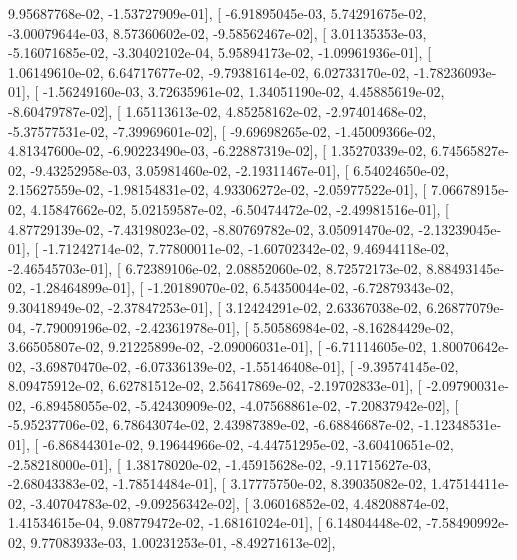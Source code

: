 \documentclass{article}
\begin{document}
          9.95687768e-02,  -1.53727909e-01],
       [ -6.91895045e-03,   5.74291675e-02,  -3.00079644e-03,
          8.57360602e-02,  -9.58562467e-02],
       [  3.01135353e-03,  -5.16071685e-02,  -3.30402102e-04,
          5.95894173e-02,  -1.09961936e-01],
       [  1.06149610e-02,   6.64717677e-02,  -9.79381614e-02,
          6.02733170e-02,  -1.78236093e-01],
       [ -1.56249160e-03,   3.72635961e-02,   1.34051190e-02,
          4.45885619e-02,  -8.60479787e-02],
       [  1.65113613e-02,   4.85258162e-02,  -2.97401468e-02,
         -5.37577531e-02,  -7.39969601e-02],
       [ -9.69698265e-02,  -1.45009366e-02,   4.81347600e-02,
         -6.90223490e-03,  -6.22887319e-02],
       [  1.35270339e-02,   6.74565827e-02,  -9.43252958e-03,
          3.05981460e-02,  -2.19311467e-01],
       [  6.54024650e-02,   2.15627559e-02,  -1.98154831e-02,
          4.93306272e-02,  -2.05977522e-01],
       [  7.06678915e-02,   4.15847662e-02,   5.02159587e-02,
         -6.50474472e-02,  -2.49981516e-01],
       [  4.87729139e-02,  -7.43198023e-02,  -8.80769782e-02,
          3.05091470e-02,  -2.13239045e-01],
       [ -1.71242714e-02,   7.77800011e-02,  -1.60702342e-02,
          9.46944118e-02,  -2.46545703e-01],
       [  6.72389106e-02,   2.08852060e-02,   8.72572173e-02,
          8.88493145e-02,  -1.28464899e-01],
       [ -1.20189070e-02,   6.54350044e-02,  -6.72879343e-02,
          9.30418949e-02,  -2.37847253e-01],
       [  3.12424291e-02,   2.63367038e-02,   6.26877079e-04,
         -7.79009196e-02,  -2.42361978e-01],
       [  5.50586984e-02,  -8.16284429e-02,   3.66505807e-02,
          9.21225899e-02,  -2.09006031e-01],
       [ -6.71114605e-02,   1.80070642e-02,  -3.69870470e-02,
         -6.07336139e-02,  -1.55146408e-01],
       [ -9.39574145e-02,   8.09475912e-02,   6.62781512e-02,
          2.56417869e-02,  -2.19702833e-01],
       [ -2.09790031e-02,  -6.89458055e-02,  -5.42430909e-02,
         -4.07568861e-02,  -7.20837942e-02],
       [ -5.95237706e-02,   6.78643074e-02,   2.43987389e-02,
         -6.68846687e-02,  -1.12348531e-01],
       [ -6.86844301e-02,   9.19644966e-02,  -4.44751295e-02,
         -3.60410651e-02,  -2.58218000e-01],
       [  1.38178020e-02,  -1.45915628e-02,  -9.11715627e-03,
         -2.68043383e-02,  -1.78514484e-01],
       [  3.17775750e-02,   8.39035082e-02,   1.47514411e-02,
         -3.40704783e-02,  -9.09256342e-02],
       [  3.06016852e-02,   4.48208874e-02,   1.41534615e-04,
          9.08779472e-02,  -1.68161024e-01],
       [  6.14804448e-02,  -7.58490992e-02,   9.77083933e-03,
          1.00231253e-01,  -8.49271613e-02],
\end{document}
